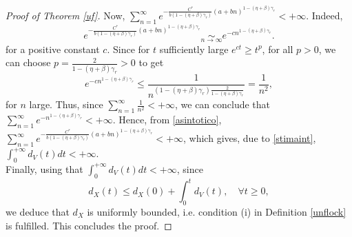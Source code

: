 \documentclass[11pt]{article}
\begin{document}
\begin{proof}[Proof of Theorem \ref{uf}]
    Now, $\sum\limits_{n=1}^{\infty}e^{-\frac{C^*}{b(1-(\eta+\beta)\gamma_r)}(a+bn)^{1-(\eta+\beta)\gamma_r}}<+\infty$. Indeed, 
   { \begin{equation}\label{asintotico}
        e^{-\frac{C^*}{b(1-(\eta+\beta)\gamma_r)}(a+bn)^{1-(\eta+\beta)\gamma_r}}\underset{n\to\infty}{\sim} e^{-cn^{1-(\eta+\beta)\gamma_r}}.
    \end{equation}
    for a positive constant $c.$
    Since for $t$ sufficiently large $e^{ct}\geq t^p$, for all $p>0$, we can choose $p=\frac{2}{1-(\eta+\beta)\gamma_r}>0$ to get
    $$e^{-cn^{1-(\eta+\beta)\gamma_r}}\leq \frac{1}{n^{(1-(\eta+\beta)\gamma_r)\frac{2}{1-(\eta+\beta)\gamma_r}}}=\frac{1}{n^2},$$
    for $n$ large.} Thus, since $\sum\limits_{n=1}^{\infty}\frac{1}{n^2}<+\infty$, we can conclude that $\sum\limits_{n=1}^{\infty}e^{-n^{1-(\eta+\beta)\gamma_r}}<+\infty$. Hence, from \eqref{asintotico}, $\sum\limits_{n=1}^{\infty}e^{-\frac{C^*}{b(1-(\eta+\beta)\gamma_r)}(a+bn)^{1-(\eta+\beta)\gamma_r}}<+\infty$, which gives, due to \eqref{stimaint}, $\int_0^{+\infty}d_V(t)dt<+\infty$. \\Finally, using that $\int_0^{+\infty}d_V(t)dt<+\infty$, since  
    $$d_X(t)\leq d_X(0)+\int_0^{t}d_V(t),\quad \forall t\geq 0,$$
    we deduce that $d_X$ is uniformly bounded, i.e. condition (i) in Definition \ref{unflock} is fulfilled. This concludes the proof.
    
    
    
    \end{proof}
\end{document}
